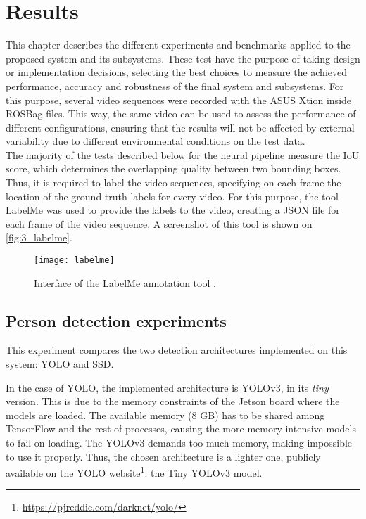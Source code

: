 \chapter{Results}
\label{chap:3_results}

This chapter describes the different experiments and benchmarks applied to the proposed system and its subsystems. These test have the purpose of taking design or implementation decisions, selecting the best choices to measure the achieved performance, accuracy and robustness of the final system and subsystems. For this purpose, several video sequences were recorded with the ASUS Xtion inside ROSBag files. This way, the same video can be used to assess the performance of different configurations, ensuring that the results will not be affected by external variability due to different environmental conditions on the test data.\\

The majority of the tests described below for the neural pipeline measure the IoU score, which determines the overlapping quality between two bounding boxes. Thus, it is required to label the video sequences, specifying on each frame the location of the ground truth labels for every video. For this purpose, the tool LabelMe \cite{labelme} was used to provide the labels to the video, creating a JSON file for each frame of the video sequence. A screenshot of this tool is shown on \autoref{fig:3_labelme}.


\begin{figure}[h]
	\centering
	\texttt{[image: labelme]}
	\caption{Interface of the LabelMe annotation tool \cite{labelme}.}
	\label{fig:3_labelme}
\end{figure}


\section{Person detection experiments}
\label{sec:3_test1}
This experiment compares the two detection architectures implemented on this system: YOLO \cite{yolov3} and SSD\cite{ssd}.

In the case of YOLO, the implemented architecture is YOLOv3, in its \textit{tiny} version. This is due to the memory constraints of the Jetson board where the models are loaded. The available memory (8 GB) has to be shared among TensorFlow and the rest of processes, causing the more memory-intensive models to fail on loading. The YOLOv3 demands too much memory, making impossible to use it properly. Thus, the chosen architecture is a lighter one, publicly available on the YOLO website\footnote{\url{https://pjreddie.com/darknet/yolo/}}: the Tiny YOLOv3 model.

